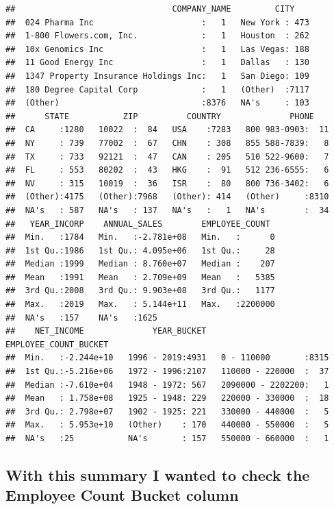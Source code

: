 \documentclass[]{article}
\begin{document}
\begin{verbatim}
##                                COMPANY_NAME         CITY     
##  024 Pharma Inc                      :   1   New York : 473  
##  1-800 Flowers.com, Inc.             :   1   Houston  : 262  
##  10x Genomics Inc                    :   1   Las Vegas: 188  
##  11 Good Energy Inc                  :   1   Dallas   : 130  
##  1347 Property Insurance Holdings Inc:   1   San Diego: 109  
##  180 Degree Capital Corp             :   1   (Other)  :7117  
##  (Other)                             :8376   NA's     : 103  
##      STATE           ZIP          COUNTRY              PHONE     
##  CA     :1280   10022  :  84   USA    :7283   800 983-0903:  11  
##  NY     : 739   77002  :  67   CHN    : 308   855 588-7839:   8  
##  TX     : 733   92121  :  47   CAN    : 205   510 522-9600:   7  
##  FL     : 553   80202  :  43   HKG    :  91   512 236-6555:   6  
##  NV     : 315   10019  :  36   ISR    :  80   800 736-3402:   6  
##  (Other):4175   (Other):7968   (Other): 414   (Other)     :8310  
##  NA's   : 587   NA's   : 137   NA's   :   1   NA's        :  34  
##   YEAR_INCORP    ANNUAL_SALES        EMPLOYEE_COUNT   
##  Min.   :1784   Min.   :-2.781e+08   Min.   :      0  
##  1st Qu.:1986   1st Qu.: 4.095e+06   1st Qu.:     28  
##  Median :1999   Median : 8.760e+07   Median :    207  
##  Mean   :1991   Mean   : 2.709e+09   Mean   :   5385  
##  3rd Qu.:2008   3rd Qu.: 9.903e+08   3rd Qu.:   1177  
##  Max.   :2019   Max.   : 5.144e+11   Max.   :2200000  
##  NA's   :157    NA's   :1625                          
##    NET_INCOME              YEAR_BUCKET         EMPLOYEE_COUNT_BUCKET
##  Min.   :-2.244e+10   1996 - 2019:4931   0 - 110000       :8315     
##  1st Qu.:-5.216e+06   1972 - 1996:2107   110000 - 220000  :  37     
##  Median :-7.610e+04   1948 - 1972: 567   2090000 - 2202200:   1     
##  Mean   : 1.758e+08   1925 - 1948: 229   220000 - 330000  :  18     
##  3rd Qu.: 2.798e+07   1902 - 1925: 221   330000 - 440000  :   5     
##  Max.   : 5.953e+10   (Other)    : 170   440000 - 550000  :   5     
##  NA's   :25           NA's       : 157   550000 - 660000  :   1
\end{verbatim}

\hypertarget{with-this-summary-i-wanted-to-check-the-employee-count-bucket-column}{%
\subsection{With this summary I wanted to check the Employee Count
Bucket
column}\label{with-this-summary-i-wanted-to-check-the-employee-count-bucket-column}}
\end{document}
